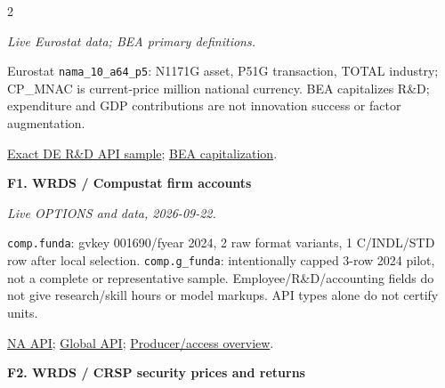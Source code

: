\documentclass[10pt,a4paper,landscape]{article}
\newcommand{\code}[1]{{\footnotesize\texttt{#1}}}
\begin{document}
\begin{multicols}{2}
\begin{minipage}{\linewidth}
{\footnotesize\itshape Live Eurostat data; BEA primary definitions.}\par

Eurostat \code{nama\_10\_a64\_p5}: N1171G asset, P51G transaction, TOTAL industry; CP\_MNAC is current-price million national currency. BEA capitalizes R\&D; expenditure and GDP contributions are not innovation success or factor augmentation.

\par \href{https://ec.europa.eu/eurostat/api/dissemination/statistics/1.0/data/nama_10_a64_p5?geo=DE&freq=A&nace_r2=TOTAL&asset10=N1171G&na_item=P51G&unit=CP_MNAC&sinceTimePeriod=2021&untilTimePeriod=2023}{Exact DE R\&D API sample}; \href{https://www.bea.gov/help/faq/1028}{BEA capitalization}.

\end{minipage}\par\vspace{6pt}

\noindent\begin{minipage}{\linewidth}\raggedright

\hypertarget{src-F1}{\textbf{F1. WRDS / Compustat firm accounts}}\par

{\footnotesize\itshape Live OPTIONS and data, 2026-09-22.}\par

\code{comp.funda}: gvkey 001690/fyear 2024, 2 raw format variants, 1 C/INDL/STD row after local selection. \code{comp.g\_funda}: intentionally capped 3-row 2024 pilot, not a complete or representative sample. Employee/R\&D/accounting fields do not give research/skill hours or model markups. API types alone do not certify units.

\par \href{https://wrds-api.wharton.upenn.edu/data/comp.funda/}{NA API}; \href{https://wrds-api.wharton.upenn.edu/data/comp.g_funda/}{Global API}; \href{https://wrds-www.wharton.upenn.edu/pages/grid-items/introduction-compustat-part-1/}{Producer/access overview}.

\end{minipage}\par\vspace{6pt}

\noindent\begin{minipage}{\linewidth}\raggedright

\hypertarget{src-F2}{\textbf{F2. WRDS / CRSP security prices and returns}}\par


\end{minipage}
\end{multicols}
\end{document}
